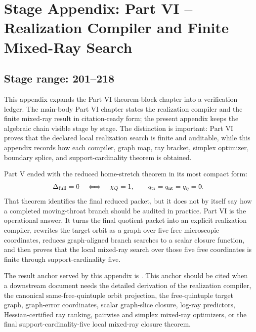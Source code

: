 \chapter{Stage Appendix: Part VI -- Realization Compiler and Finite Mixed-Ray Search}
\label{app:stage-part-6}

\section*{Stage range: 201--218}

This appendix expands the Part VI theorem-block chapter into a verification ledger.  The main-body Part VI chapter states the realization compiler and the finite mixed-ray result in citation-ready form; the present appendix keeps the algebraic chain visible stage by stage.  The distinction is important: Part VI proves that the declared local realization search is finite and auditable, while this appendix records how each compiler, graph map, ray bracket, simplex optimizer, boundary splice, and support-cardinality theorem is obtained.


Part V ended with the reduced home-stretch theorem in its most compact form:
\begin{equation}
\label{eq:app-part06-intro-full-packet}
\Delta_{\rm full}=0
\quad\Longleftrightarrow\quad
\chi_Q=1,
\qquad
q_{\rm tr}=q_{\rm nt}=q_\eta=0.
\end{equation}
That theorem identifies the final reduced packet, but it does not by itself say how a completed moving-throat branch should be audited in practice.  Part VI is the operational answer.  It turns the final quotient packet into an explicit realization compiler, rewrites the target orbit as a graph over five free microscopic coordinates, reduces graph-aligned branch searches to a scalar closure function, and then proves that the local mixed-ray search over those five free coordinates is finite through support-cardinality five.

The result anchor served by this appendix is .  This anchor should be cited when a downstream document needs the detailed derivation of the realization compiler, the canonical same-free-quintuple orbit projection, the free-quintuple target graph, graph-error coordinates, scalar graph-slice closure, log-ray predictors, Hessian-certified ray ranking, pairwise and simplex mixed-ray optimizers, or the final support-cardinality-five local mixed-ray closure theorem.

